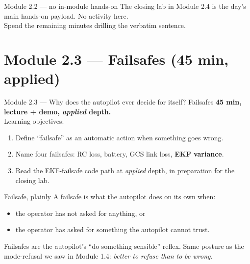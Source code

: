 \documentclass[aspectratio=169,11pt]{beamer}
\begin{document}
\begin{frame}{Module 2.2 --- no in-module hands-on}
  The closing lab in Module 2.4 is the day's main hands-on payload. No activity here.\\[1ex]
  Spend the remaining minutes drilling the verbatim sentence.
\end{frame}

\section{Module 2.3 --- Failsafes (45 min, applied)}

\begin{frame}{Module 2.3 --- Why does the autopilot ever decide for itself? Failsafes}
  \textbf{45 min, lecture + demo, \emph{applied} depth.}\\[1ex]
  Learning objectives:
  \begin{enumerate}
    \item Define ``failsafe'' as an automatic action when something goes wrong.
    \item Name four failsafes: RC loss, battery, GCS link loss, \textbf{EKF variance}.
    \item Read the EKF-failsafe code path at \emph{applied} depth, in preparation for the closing lab.
  \end{enumerate}
\end{frame}

\begin{frame}{Failsafe, plainly}
  A failsafe is what the autopilot does on its own when:
  \begin{itemize}
    \item the operator has not asked for anything, or
    \item the operator has asked for something the autopilot cannot trust.
  \end{itemize}
  Failsafes are the autopilot's ``do something sensible'' reflex.
  \vfill
  Same posture as the mode-refusal we saw in Module 1.4: \emph{better to refuse than to be wrong.}
\end{frame}
\end{document}
